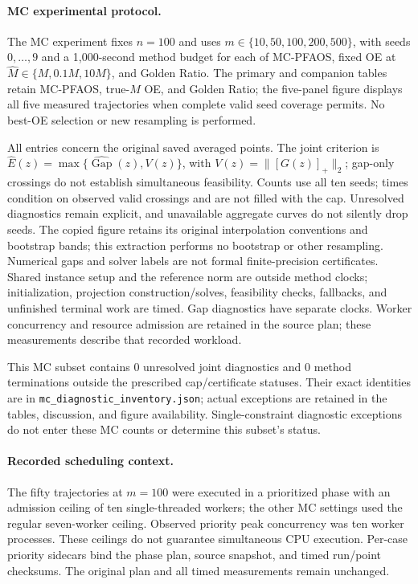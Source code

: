 \paragraph{MC experimental protocol.}
The MC experiment fixes $n=100$ and uses $m\in\{10,50,100,200,500\}$,
with seeds $0,\ldots,9$ and a 1,000-second method budget for each of
MC-PFAOS, fixed OE at $\widehat M\in\{M,0.1M,10M\}$, and Golden Ratio.
The primary and companion tables retain MC-PFAOS, true-$M$ OE, and Golden Ratio;
the five-panel figure displays all five measured trajectories when complete
valid seed coverage permits. No best-OE selection or new resampling is performed.

All entries concern the original saved averaged points. The joint criterion is
$\widehat E(z)=\max\{\widehat{\operatorname{Gap}}(z),V(z)\}$, with
$V(z)=\|[G(z)]_+\|_2$; gap-only crossings do not establish simultaneous
feasibility. Counts use all ten seeds; times condition on observed valid
crossings and are not filled with the cap. Unresolved diagnostics remain
explicit, and unavailable aggregate curves do not silently drop seeds.
The copied figure retains its original interpolation conventions and bootstrap
bands; this extraction performs no bootstrap or other resampling.
Numerical gaps and solver labels are not formal finite-precision certificates.
Shared instance setup and the reference norm are outside method clocks;
initialization, projection construction/solves, feasibility checks, fallbacks,
and unfinished terminal work are timed. Gap diagnostics have separate clocks.
Worker concurrency and resource admission are retained in the source plan;
these measurements describe that recorded workload.

This MC subset contains 0 unresolved
joint diagnostics and 0 method terminations
outside the prescribed cap/certificate statuses. Their exact identities are in
\texttt{mc\_diagnostic\_inventory.json}; actual exceptions are retained in the
tables, discussion, and figure availability. Single-constraint diagnostic
exceptions do not enter these MC counts or determine this subset's status.

\paragraph{Recorded scheduling context.}
The fifty trajectories at $m=100$ were executed in a prioritized phase
with an admission ceiling of ten single-threaded workers; the other MC
settings used the regular seven-worker ceiling. Observed priority peak
concurrency was ten worker processes. These ceilings do not guarantee
simultaneous CPU execution. Per-case priority sidecars bind the phase plan,
source snapshot, and timed run/point checksums. The original plan and all
timed measurements remain unchanged.

\par

